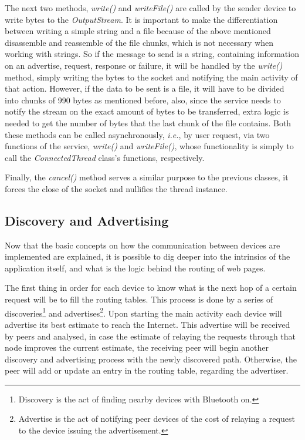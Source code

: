 The next two methods, \textit{write()} and \textit{writeFile()} are called by the sender device to write bytes to the \textit{OutputStream}. It is important to make the differentiation between writing a simple string and a file because of the above mentioned disassemble and reassemble of the file chunks, which is not necessary when working with strings. So if the message to send is a string, containing information on an advertise, request, response or failure, it will be handled by the \textit{write()} method, simply writing the bytes to the socket and notifying the main activity of that action. However, if the data to be sent is a file, it will have to be divided into chunks of 990 bytes as mentioned before, also, since the service needs to notify the stream on the exact amount of bytes to be transferred, extra logic is needed to get the number of bytes that the last chunk of the file contains. Both these methods can be called asynchronously, \textit{i.e.}, by user request, via two functions of the service, \textit{write()} and \textit{writeFile()}, whose functionality is simply to call the \textit{ConnectedThread} class's functions, respectively.

Finally, the \textit{cancel()} method serves a similar purpose to the previous classes, it forces the close of the socket and nullifies the thread instance.

\subsection{Discovery and Advertising}
\label{subsec:disandadv}

Now that the basic concepts on how the communication between devices are implemented are explained, it is possible to dig deeper into the intrinsics of the application itself, and what is the logic behind the routing of web pages.

The first thing in order for each device to know what is the next hop of a certain request will be to fill the routing tables. This process is done by a series of discoveries\footnote{Discovery is the act of finding nearby devices with Bluetooth on.} and advertises\footnote{Advertise is the act of notifying peer devices of the cost of relaying a request to the device issuing the advertisement.}. Upon starting the main activity each device will advertise its best estimate to reach the Internet. This advertise will be received by peers and analysed, in case the estimate of relaying the requests through that node improves the current estimate, the receiving peer will begin another discovery and advertising process with the newly discovered path. Otherwise, the peer will add or update an entry in the routing table, regarding the advertiser.

